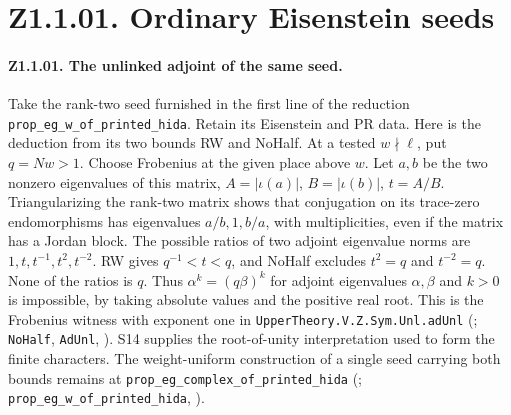 \section*{Z1.1.01. Ordinary Eisenstein seeds}

\paragraph{Z1.1.01. The unlinked adjoint of the same seed.}
\label{r8:small:Z1.1.01}
Take the rank-two seed furnished in the first line of the reduction
\nolinkurl{prop_eg_w_of_printed_hida}. Retain its Eisenstein and PR data.
Here is the deduction from its two bounds RW and NoHalf. At a tested
\(w\nmid\ell\), put \(q=Nw>1\). Choose Frobenius at the given place
above \(w\). Let \(a,b\) be the two nonzero eigenvalues of this matrix,
\(A=|\iota(a)|\), \(B=|\iota(b)|\), \(t=A/B\). Triangularizing the
rank-two matrix shows that conjugation on its trace-zero endomorphisms
has eigenvalues \(a/b,1,b/a\), with multiplicities, even if the matrix
has a Jordan block. The possible ratios of two adjoint eigenvalue norms
are \(1,t,t^{-1},t^2,t^{-2}\). RW gives \(q^{-1}<t<q\), and NoHalf
excludes \(t^2=q\) and \(t^{-2}=q\). None of the ratios is \(q\).
Thus \(\alpha^k=(q\beta)^k\) for adjoint eigenvalues \(\alpha,\beta\) and \(k>0\) is impossible, by taking absolute values and the positive real root. This is the Frobenius witness
with exponent one in \nolinkurl{UpperTheory.V.Z.Sym.Unl.adUnl}
(;
\nolinkurl{NoHalf}, \nolinkurl{AdUnl}, ).
S14 supplies the root-of-unity interpretation used to form the finite
characters. The weight-uniform construction of a single seed carrying both
bounds remains at \nolinkurl{prop_eg_complex_of_printed_hida}
(; \nolinkurl{prop_eg_w_of_printed_hida},
).


